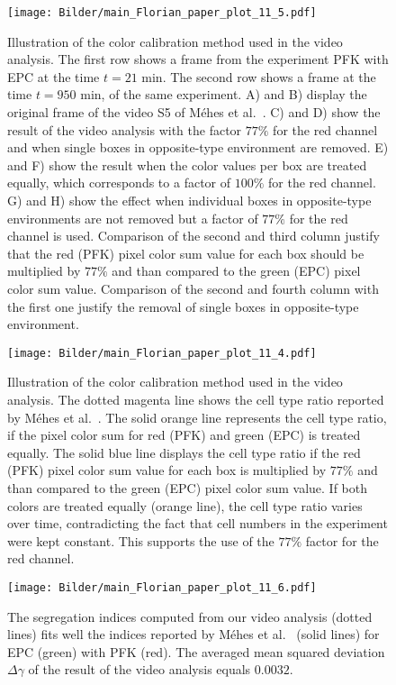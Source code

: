 \documentclass[10pt,letterpaper]{article}
\begin{document}
\begin{figure}[ht!]
 \centering
 \texttt{[image: Bilder/main\_Florian\_paper\_plot\_11\_5.pdf]}
 \caption{Illustration of the color calibration method used in the video
   analysis. The first row shows a frame from the experiment PFK with
   EPC at the time $t = 21$ min. The second row shows a frame at the
   time $t=950$ min, of the same experiment. A) and B) display the
   original frame of the video S5 of Méhes et
   al.~\cite{MehMonNemVic2012}. C) and D) show the result of the video
   analysis with the factor $77\%$ for the red channel and when single
   boxes in opposite-type environment are removed. E) and F) show the
   result when the color values per box are treated equally, which
   corresponds to a factor of $100\%$ for the red channel. G) and H)
   show the effect when individual boxes in opposite-type environments
   are not removed but a factor of $77\%$ for the red channel is used.
   Comparison of the second and third column justify that the red (PFK)
   pixel color sum value for each box should be multiplied by $77\%$
   and than compared to the green (EPC) pixel color sum value.
   Comparison of the second and fourth column with the first one
   justify the removal of single boxes in opposite-type environment.}
 \label{fig:main_Florian_paper_plot_11_5}
\end{figure}

\begin{figure}[ht!]
 \centering
 \texttt{[image: Bilder/main\_Florian\_paper\_plot\_11\_4.pdf]}
 \caption{Illustration of the color calibration method used in the video
   analysis. The dotted magenta line shows the cell type ratio
   reported by Méhes et al.~\cite{MehMonNemVic2012}. The solid orange
   line represents the cell type ratio, if the pixel color sum for red
   (PFK) and green (EPC) is treated equally. The solid blue line
   displays the cell type ratio if the red (PFK) pixel color sum value for
   each box is multiplied by $77\%$ and than compared to the green
   (EPC) pixel color sum value. If both colors are treated equally
   (orange line), the cell type ratio varies over time, contradicting the fact
   that cell numbers in the experiment were kept constant. This supports
   the use of the $77\%$ factor for the red channel.}
 \label{fig:main_Florian_paper_plot_11_4}
\end{figure}

\begin{figure}[ht!]
 \centering
 \texttt{[image: Bilder/main\_Florian\_paper\_plot\_11\_6.pdf]}
 \caption{The segregation indices computed from our video analysis
   (dotted lines) fits well the indices reported by Méhes et
   al.~\cite{MehMonNemVic2012} (solid lines) for EPC (green) with PFK
   (red). The averaged mean squared deviation $\Delta\gamma$ of the result of
   the video analysis equals $0.0032$.}
 \label{fig:main_Florian_paper_plot_11_6}
\end{figure}
\end{document}

